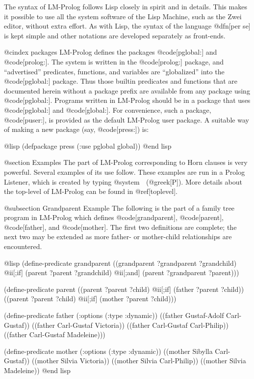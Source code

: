 {The syntax of LM-Prolog follows Lisp closely in spirit and in details.
This makes it possible to use all the system software of the Lisp Machine,
such as the Zwei editor, without extra effort.
As with Lisp, the syntax of the language @dfn[per se] is kept simple and other
notations are developed separately as front-ends.

@cindex packages
LM-Prolog defines the packages @code[pglobal:] and @code[prolog:].
The system is written in the @code[prolog:] package, and ``advertised''
predicates, functions, and variables are ``globalized'' into the
@code[pglobal:] package.
Thus those builtin predicates and functions that are documented herein without
a package prefix are available from any package using @code[pglobal:].
Programs written in LM-Prolog should be in a package that
uses @code[pglobal:] and @code[global:].  For convenience, such a package,
@code[puser:], is provided as the default LM-Prolog user package.
A suitable way of making a new package (say, @code[press:]) is:

@lisp
(defpackage press
  (:use pglobal global))
@end lisp

@section Examples
The part of LM-Prolog corresponding to Horn clauses is very powerful.
Several examples of its use follow.  These examples are run in a Prolog
Listener, which is created by typing @system  (@greek[P]).
More details about the top-level of LM-Prolog can be found in 
@ref[toplevel].

@subsection Grandparent Example
The following is the part of a family tree program in LM-Prolog which defines
@code[grandparent], @code[parent], @code[father], and @code[mother].
The first two definitions are complete; the next two may be extended as more
father- or mother-child relationships are encountered.

@lisp
(define-predicate grandparent
  ((grandparent ?grandparent ?grandchild) @ii[;if]
   (parent ?parent ?grandchild) @ii[;and]
   (parent ?grandparent ?parent)))

(define-predicate parent
  ((parent ?parent ?child) @ii[;if]
   (father ?parent ?child)) 
  ((parent ?parent ?child) @ii[;if]
   (mother ?parent ?child)))

(define-predicate father (:options (:type :dynamic))
  ((father Gustaf-Adolf Carl-Gustaf))
  ((father Carl-Gustaf Victoria))
  ((father Carl-Gustaf Carl-Philip))
  ((father Carl-Gustaf Madeleine)))

(define-predicate mother (:options (:type :dynamic))
  ((mother Sibylla Carl-Gustaf))
  ((mother Silvia Victoria))
  ((mother Silvia Carl-Philip))
  ((mother Silvia Madeleine))
@end lisp

}
